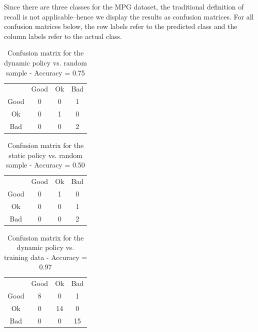 \documentclass[12pt, conference, compsocconf]{IEEEtran}
\begin{document}
Since there are three classes for the MPG dataset, the traditional definition of recall is not applicable--hence we display the results as confusion matrices. 
For all confusion matrices below, the row labels refer to the predicted class and the column labels refer to the actual class.

\begin{table}[h!]
\centering
\label{cm-dynamic-test}
\begin{tabular}{cccc}
                          & Good                   & Ok                     & Bad                    \\ \cline{2-4} 
\multicolumn{1}{c|}{Good} & \multicolumn{1}{c|}{0} & \multicolumn{1}{c|}{0} & \multicolumn{1}{c|}{1} \\ \cline{2-4} 
\multicolumn{1}{c|}{Ok}   & \multicolumn{1}{c|}{0} & \multicolumn{1}{c|}{1} & \multicolumn{1}{c|}{0} \\ \cline{2-4} 
\multicolumn{1}{c|}{Bad}  & \multicolumn{1}{c|}{0} & \multicolumn{1}{c|}{0} & \multicolumn{1}{c|}{2} \\ \cline{2-4} 
\end{tabular}
\caption{Confusion matrix for the dynamic policy vs. random sample - Accuracy = 0.75}
\end{table}

\begin{table}[h!]
\centering
\label{cm-static-test}
\begin{tabular}{cccc}
                          & Good                   & Ok                     & Bad                    \\ \cline{2-4} 
\multicolumn{1}{c|}{Good} & \multicolumn{1}{c|}{0} & \multicolumn{1}{c|}{1} & \multicolumn{1}{c|}{0} \\ \cline{2-4} 
\multicolumn{1}{c|}{Ok}   & \multicolumn{1}{c|}{0} & \multicolumn{1}{c|}{0} & \multicolumn{1}{c|}{1} \\ \cline{2-4} 
\multicolumn{1}{c|}{Bad}  & \multicolumn{1}{c|}{0} & \multicolumn{1}{c|}{0} & \multicolumn{1}{c|}{2} \\ \cline{2-4} 
\end{tabular}
\caption{Confusion matrix for the static policy vs. random sample - Accuracy = 0.50}
\end{table}

\begin{table}[h!]
\centering
\label{cm-dynamic-training}
\begin{tabular}{cccc}
                          & Good                   & Ok                      & Bad                     \\ \cline{2-4} 
\multicolumn{1}{c|}{Good} & \multicolumn{1}{c|}{8} & \multicolumn{1}{c|}{0}  & \multicolumn{1}{c|}{1}  \\ \cline{2-4} 
\multicolumn{1}{c|}{Ok}   & \multicolumn{1}{c|}{0} & \multicolumn{1}{c|}{14} & \multicolumn{1}{c|}{0}  \\ \cline{2-4} 
\multicolumn{1}{c|}{Bad}  & \multicolumn{1}{c|}{0} & \multicolumn{1}{c|}{0}  & \multicolumn{1}{c|}{15} \\ \cline{2-4} 
\end{tabular}
\caption{Confusion matrix for the dynamic policy vs. training data - Accuracy = 0.97}
\end{table}
\end{document}
